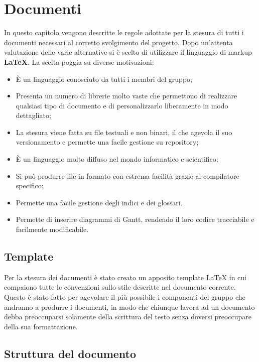 \section{Documenti}

In questo capitolo vengono descritte le regole adottate per la stesura di tutti i documenti necessari al corretto svolgimento del progetto. Dopo un'attenta valutazione delle varie alternative si è scelto di utilizzare il linguaggio di markup \textbf{\LaTeX{}}. La scelta poggia su diverse motivazioni:

\begin{itemize}

	\item È un linguaggio conosciuto da tutti i membri del gruppo;
	\item Presenta un numero di librerie molto vaste che permettono di realizzare qualsiasi tipo di documento e di personalizzarlo liberamente in modo dettagliato;
	\item La stesura viene fatta su file testuali e non binari, il che agevola il suo versionamento e permette una facile gestione su repository;
	\item È un linguaggio molto diffuso nel mondo informatico e scientifico;
	\item Si può produrre file in formato  con estrema facilità grazie al compilatore specifico;
	\item Permette una facile gestione degli indici e dei glossari.
	\item Permette di inserire diagrammi di Gantt, rendendo il loro codice tracciabile e facilmente modificabile.

\end{itemize}

\subsection{Template}

Per la stesura dei documenti è stato creato un apposito template \LaTeX{} in cui compaiono tutte le convenzioni sullo stile descritte nel documento corrente. Questo è stato fatto per agevolare il più possibile i componenti del gruppo che andranno a produrre i documenti, in modo che chiunque lavora ad un documento debba preoccuparsi solamente della scrittura del testo senza doversi preoccupare della sua formattazione. 

\subsection{Struttura del documento}

